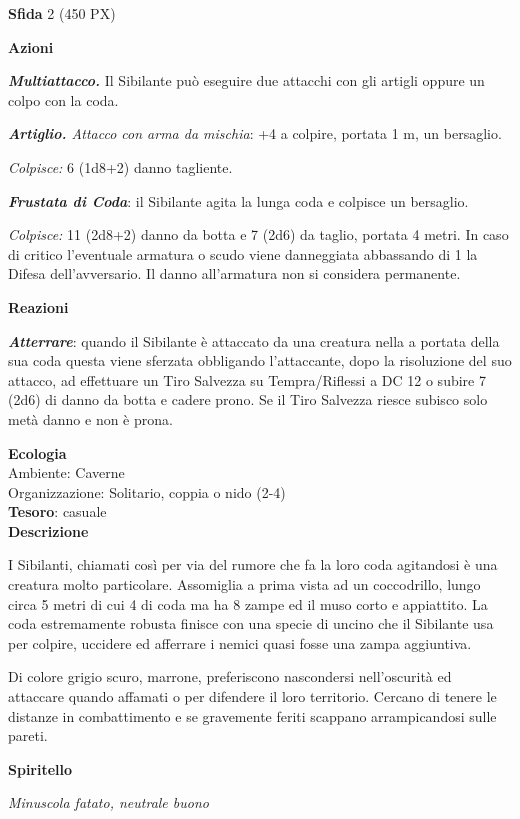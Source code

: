 \begin{multicols}{2}
\textbf{Sfida} 2 (450 PX)

\textbf{Azioni}

\textit{\textbf{Multiattacco.}} Il Sibilante può eseguire due attacchi con gli artigli oppure un colpo con la coda.

\textit{\textbf{Artiglio.} Attacco con arma da mischia}: +4 a colpire, portata 1 m, un bersaglio.

\textit{Colpisce:} 6 (1d8+2) danno tagliente.

\textit{\textbf{Frustata di Coda}}: il Sibilante agita la lunga coda e colpisce un bersaglio.

\textit{Colpisce:} 11 (2d8+2) danno da botta e 7 (2d6) da taglio, portata 4 metri. In caso di critico l'eventuale armatura o scudo viene danneggiata abbassando di 1 la Difesa dell'avversario. Il danno all'armatura non si considera permanente.

\textbf{Reazioni}

\textit{\textbf{Atterrare}}: quando il Sibilante è attaccato da una creatura nella a portata della sua coda questa viene sferzata obbligando l'attaccante, dopo la risoluzione del suo attacco, ad effettuare un Tiro Salvezza su Tempra/Riflessi a DC 12 o subire 7 (2d6) di danno da botta e cadere prono. Se il Tiro Salvezza riesce subisco solo metà danno e non è prona.

\textbf{Ecologia}\\
Ambiente: Caverne\\
Organizzazione: Solitario, coppia o nido (2-4)\\
\textbf{Tesoro}: casuale\\

\textbf{Descrizione}

I Sibilanti, chiamati così per via del rumore che fa la loro coda agitandosi è una creatura molto particolare. Assomiglia a prima vista ad un coccodrillo, lungo circa 5 metri di cui 4 di coda ma ha 8 zampe ed il muso corto e appiattito. La coda estremamente robusta finisce con una specie di uncino che il Sibilante usa per colpire, uccidere ed afferrare i nemici quasi fosse una zampa aggiuntiva.

Di colore grigio scuro, marrone, preferiscono nascondersi nell'oscurità ed attaccare quando affamati o per difendere il loro territorio. Cercano di tenere le distanze in combattimento e se gravemente feriti scappano arrampicandosi sulle pareti.


\medskip{}\textbf{Spiritello}

\textit{Minuscola fatato, neutrale buono}


\end{multicols}
